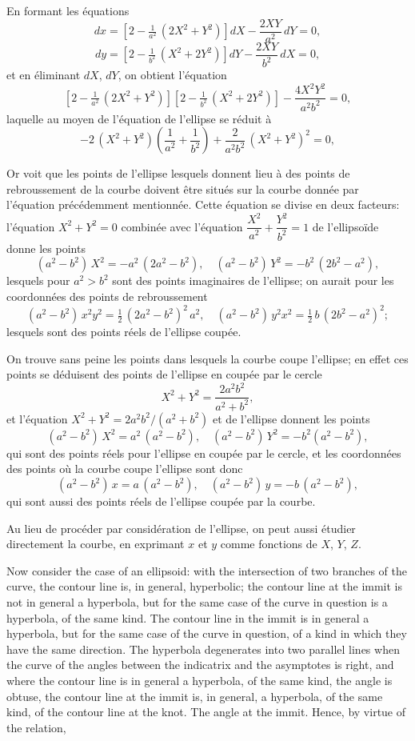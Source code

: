 \documentclass[11pt,a4paper]{article}
\begin{document}
En formant les équations
\[
dx = \left[2 - \tfrac{1}{a^2}\,(2X^2+Y^2)\right]dX - \frac{2XY}{a^2}\,dY = 0,
\]
\[
dy = \left[2 - \tfrac{1}{b^2}\,(X^2+2Y^2)\right]dY - \frac{2XY}{b^2}\,dX = 0,
\]
et en éliminant $dX$, $dY$, on obtient l'équation
\[
\left[2 - \tfrac{1}{a^2}\,(2X^2+Y^2)\right]\left[2 - \tfrac{1}{b^2}\,(X^2+2Y^2)\right] - \frac{4X^2Y^2}{a^2b^2} = 0,
\]
laquelle au moyen de l'équation de l'ellipse se réduit à
\[
- 2\,(X^2 + Y^2)\left(\frac{1}{a^2} + \frac{1}{b^2}\right) + \frac{2}{a^2b^2}\,(X^2+Y^2)^2 = 0,
\]

\setcounter{page}{125}

Or voit que les points de l'ellipse lesquels donnent lieu à des points de rebroussement de la courbe doivent être situés sur la courbe donnée par l'équation précédemment mentionnée. Cette équation se divise en deux facteurs: l'équation $X^2 + Y^2 = 0$ combinée avec l'équation $\dfrac{X^2}{a^2} + \dfrac{Y^2}{b^2} = 1$ de l'ellipsoïde donne les points
\[
(a^2-b^2)\,X^2 = -a^2\,(2a^2-b^2),\quad (a^2-b^2)\,Y^2 = -b^2\,(2b^2-a^2),
\]
lesquels pour $a^2 > b^2$ sont des points imaginaires de l'ellipse; on aurait pour les coordonnées des points de rebroussement
\[
(a^2-b^2)\,x^2y^2 = \tfrac{1}{2}\,(2a^2-b^2)^2\,a^2,\quad (a^2-b^2)\,y^2x^2 = \tfrac{1}{2}\,b\,(2b^2-a^2)^2;
\]
lesquels sont des points réels de l'ellipse coupée.

On trouve sans peine les points dans lesquels la courbe coupe l'ellipse; en effet ces points se déduisent des points de l'ellipse en coupée par le cercle
\[
X^2 + Y^2 = \frac{2a^2b^2}{a^2+b^2},
\]
et l'équation $X^2 + Y^2 = 2a^2b^2/(a^2+b^2)$ et de l'ellipse donnent les points
\[
(a^2-b^2)\,X^2 = a^2\,(a^2-b^2),\quad (a^2-b^2)\,Y^2 = -b^2(a^2-b^2),
\]
qui sont des points réels pour l'ellipse en coupée par le cercle, et les coordonnées des points où la courbe coupe l'ellipse sont donc
\[
(a^2-b^2)\,x = a\,(a^2-b^2),\quad (a^2-b^2)\,y = -b\,(a^2-b^2),
\]
qui sont aussi des points réels de l'ellipse coupée par la courbe.

Au lieu de procéder par considération de l'ellipse, on peut aussi étudier directement la courbe, en exprimant $x$ et $y$ comme fonctions de $X$, $Y$, $Z$.

\setcounter{page}{126}

Now consider the case of an ellipsoid: with the intersection of two branches of the curve, the contour line is, in general, hyperbolic; the contour line at the immit is not in general a hyperbola, but for the same case of the curve in question is a hyperbola, of the same kind. The contour line in the immit is in general a hyperbola, but for the same case of the curve in question, of a kind in which they have the same direction. The hyperbola degenerates into two parallel lines when the curve of the angles between the indicatrix and the asymptotes is right, and where the contour line is in general a hyperbola, of the same kind, the angle is obtuse, the contour line at the immit is, in general, a hyperbola, of the same kind, of the contour line at the knot. The angle at the immit. Hence, by virtue of the relation,
\end{document}
